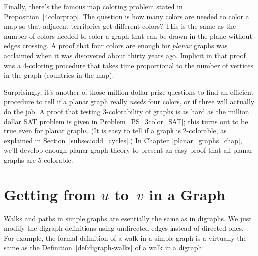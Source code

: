 Finally, there's the famous map coloring problem stated in
Proposition~\ref{4colorprop}.  The question is how many colors are
needed to color a map so that adjacent territories get different
colors?  This is the same as the number of colors needed to color a
graph that can be drawn in the plane without edges crossing.  A proof
that four colors are enough for  \emph{planar}
graphs was acclaimed when it was discovered about thirty years ago.
Implicit in that proof was a 4-coloring procedure that takes time
proportional to the number of vertices in the graph (countries in the
map).

Surprisingly, it's another of those million dollar prize questions to
find an efficient procedure to tell if a planar graph really
\emph{needs} four colors, or if three will actually do the job.  A
proof that testing 3-colorability of graphs is as hard as the million
dollar SAT problem is given in Problem~\ref{PS_3color_SAT}; this turns
out to be true even for planar graphs.  (It is easy to tell if a graph
is 2-colorable, as explained in Section~\ref{subsec:odd_cycles}.)  In
Chapter~\ref{planar_graphs_chap}, we'll develop enough planar graph
theory to present an easy proof that all planar graphs are
5-colorable.

\iffalse
Planarity is another property with important colorability consequences.
The famous 4-Color Theorem says that every planar graph is 4-colorable.
This is a hard result to prove, but we will come close in
Chapter~\ref{planar_graphs_chap} where we define planar graphs and prove
that they are 5-colorable.
\fi

\begin{problems}
\classproblems
{}

\homeworkproblems
{}

\examproblems
{}

\end{problems}



\section{Getting from $u$ to~$v$ in a Graph}\label{sec:connectedness}

Walks and paths in simple graphs are esentially the same as in digraphs.
We just modify the digraph definitions using undirected edges instead of directed
ones.  For example, the formal definition of a walk in a simple graph is a virtually
the same as the Definition~\ref{def:digraph-walks} of a walk in a digraph:

